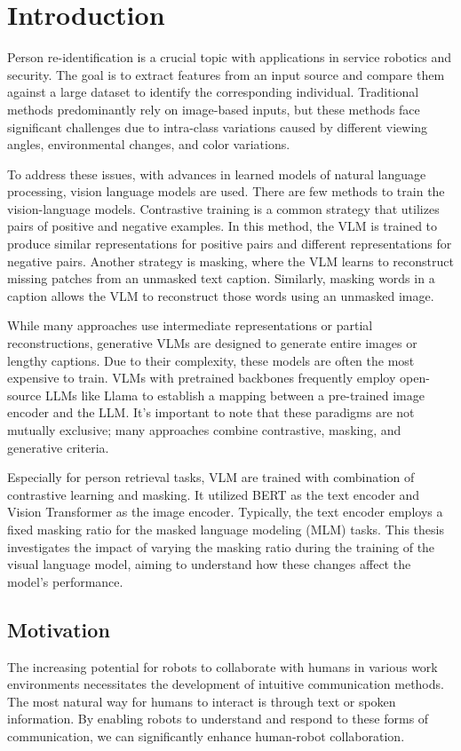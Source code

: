 \chapter{Introduction}
Person re-identification is a crucial topic with applications in service robotics and security. The goal is to extract features from an input source and compare them against a large dataset to identify the corresponding individual. Traditional methods predominantly rely on image-based inputs, but these methods face significant challenges due to intra-class variations caused by different viewing angles, environmental changes, and color variations.

To address these issues, with advances in learned models of natural language processing, vision language models are used. There are few methods to train the vision-language models. 
Contrastive training is a common strategy that utilizes pairs of positive and negative examples. In this method, the VLM is trained to produce similar representations for positive pairs and different representations for negative pairs. Another strategy is masking, where the VLM learns to reconstruct missing patches from an unmasked text caption. Similarly, masking words in a caption allows the VLM to reconstruct those words using an unmasked image.

While many approaches use intermediate representations or partial reconstructions, generative VLMs are designed to generate entire images or lengthy captions. Due to their complexity, these models are often the most expensive to train. VLMs with pretrained backbones frequently employ open-source LLMs like Llama to establish a mapping between a pre-trained image encoder and the LLM. It's important to note that these paradigms are not mutually exclusive; many approaches combine contrastive, masking, and generative criteria.

Especially for person retrieval tasks, VLM are trained with combination of contrastive learning and masking. It utilized BERT as the text encoder and Vision Transformer as the image encoder. Typically, the text encoder employs a fixed masking ratio for the masked language modeling (MLM) tasks. This thesis investigates the impact of varying the masking ratio during the training of the visual language model, aiming to understand how these changes affect the model's performance.

\section{Motivation}
The increasing potential for robots to collaborate with humans in various work environments necessitates the development of intuitive communication methods. The most natural way for humans to interact is through text or spoken information. By enabling robots to understand and respond to these forms of communication, we can significantly enhance human-robot collaboration.

